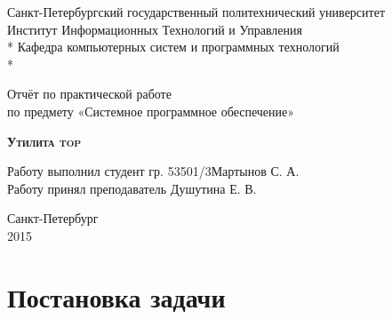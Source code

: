 \documentclass[a4paper, 12pt]{article}		%
\begin{document}
\begin{titlepage}
\thispagestyle{empty}

\begin{center}
Санкт-Петербургский государственный политехнический университет \\
Институт Информационных Технологий и Управления \\*
Кафедра компьютерных систем и программных технологий \\*
\hrulefill
\end{center}

\vspace{18em}

\begin{center}
\Large Отчёт по практической работе\\ по предмету «Системное программное обеспечение» \\
\end{center}

\vspace{1em}

\begin{center}
\textsc{\textbf{Утилита top}}
\end{center}

\vspace{16em}

\begin{flushleft}
Работу выполнил студент гр. 53501/3\hrulefill Мартынов С. А. \\
\vspace{1.5em}
Работу принял преподаватель \hrulefill Душутина Е. В. \\
\end{flushleft}

\vspace{\fill}

\begin{center}
Санкт-Петербург \\
2015
\end{center}

\end{titlepage}
\setcounter{page}{2}
\tableofcontents
\newpage
\section*{Постановка задачи}
\end{document}
